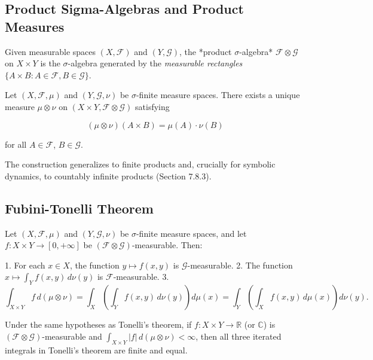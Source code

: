 \subsection{Product Sigma-Algebras and Product Measures}\label{sec:7.6.1}

Given measurable spaces $(X, \mathcal{F})$ and $(Y, \mathcal{G})$, the *product $\sigma$-algebra* $\mathcal{F} \otimes \mathcal{G}$ on $X \times Y$ is the $\sigma$-algebra generated by the \textit{measurable rectangles} $\{A \times B : A \in \mathcal{F}, B \in \mathcal{G}\}$.

\begin{theorem}\label{thm:7.32}
Let $(X, \mathcal{F}, \mu)$ and $(Y, \mathcal{G}, \nu)$ be $\sigma$-finite measure spaces. There exists a unique measure $\mu \otimes \nu$ on $(X \times Y, \mathcal{F} \otimes \mathcal{G})$ satisfying

\[
(\mu \otimes \nu)(A \times B) = \mu(A) \cdot \nu(B)
\]

for all $A \in \mathcal{F}$, $B \in \mathcal{G}$.

The construction generalizes to finite products and, crucially for symbolic dynamics, to countably infinite products (Section 7.8.3).
\end{theorem}


\subsection{Fubini-Tonelli Theorem}\label{sec:7.6.2}

\begin{theorem}[Tonelli]\label{thm:7.33}
Let $(X, \mathcal{F}, \mu)$ and $(Y, \mathcal{G}, \nu)$ be $\sigma$-finite measure spaces, and let $f: X \times Y \to [0, +\infty]$ be $(\mathcal{F} \otimes \mathcal{G})$-measurable. Then:

1. For each $x \in X$, the function $y \mapsto f(x, y)$ is $\mathcal{G}$-measurable.
2. The function $x \mapsto \int_Y f(x, y) \, d\nu(y)$ is $\mathcal{F}$-measurable.
3. $$\int_{X \times Y} f \, d(\mu \otimes \nu) = \int_X \left( \int_Y f(x,y) \, d\nu(y) \right) d\mu(x) = \int_Y \left( \int_X f(x,y) \, d\mu(x) \right) d\nu(y).$$
\end{theorem}


\begin{theorem}[Fubini]\label{thm:7.34}
Under the same hypotheses as Tonelli's theorem, if $f: X \times Y \to \mathbb{R}$ (or $\mathbb{C}$) is $(\mathcal{F} \otimes \mathcal{G})$-measurable and $\int_{X \times Y} |f| \, d(\mu \otimes \nu) < \infty$, then all three iterated integrals in Tonelli's theorem are finite and equal.
\end{theorem}


